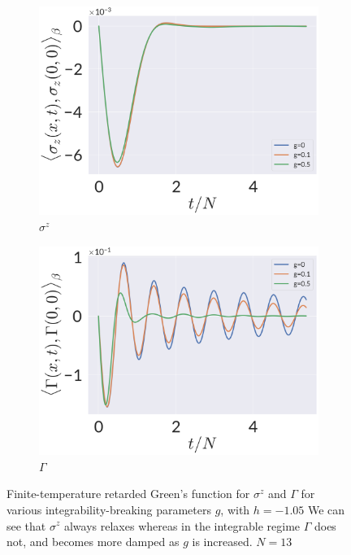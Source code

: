 \begin{figure}
	\captionsetup[subfigure]{labelformat=empty}
	\centering
\begin{subfigure}{0.5\textwidth}
	\centering
\includegraphics[width=\columnwidth]{figures/chapter1/SigmaZ-CommEvolv13.png}
\caption{$\sigma^z$}
\label{fig:gr-sigma}
\end{subfigure}%
\begin{subfigure}{0.5\textwidth}
	\centering
\includegraphics[width=\columnwidth]{figures/chapter1/gamma-commevolv.png}
\caption{$\Gamma$}
\label{fig:gr-gamma}
\end{subfigure}
\caption{Finite-temperature retarded Green's function for $\sigma^z$ and $\Gamma$ for various integrability-breaking parameters $g$, with $h=-1.05$ We can see that $\sigma^z$ always relaxes whereas in the integrable regime $\Gamma$ does not, and becomes more damped as $g$ is increased. $N=13$}
\end{figure}

